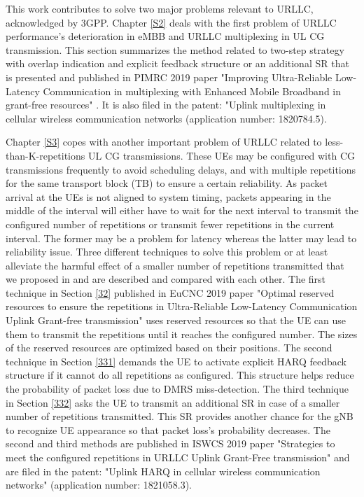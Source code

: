 \documentclass{report}
\begin{document}
This work contributes to solve two major problems relevant to URLLC, acknowledged by 3GPP. Chapter \ref{S2} deals with the first problem of URLLC performance's deterioration in eMBB and URLLC multiplexing in UL CG transmission. This section summarizes the method related to two-step strategy with overlap indication and explicit feedback structure or an additional SR that is presented and published in  PIMRC 2019 paper "Improving Ultra-Reliable Low-Latency Communication in multiplexing with Enhanced Mobile Broadband in grant-free resources" \cite{ad99}. It is also filed in the patent: "Uplink multiplexing in cellular wireless communication networks (application number: 1820784.5). 

Chapter \ref{S3} copes with another important problem of URLLC related to less-than-K-repetitions UL CG transmissions. These UEs may be configured with CG transmissions frequently to avoid scheduling delays, and with multiple repetitions for the same transport block (TB) to ensure a certain reliability. As packet arrival at the UEs is not aligned to system timing, packets appearing in the middle of the interval will either have to wait for the next interval to transmit the configured number of repetitions or transmit fewer repetitions in the current interval. The former may be a problem for latency whereas the latter may lead to reliability issue. Three different techniques to solve this problem or at least alleviate the harmful effect of a smaller number of repetitions transmitted that we proposed in \cite{b9} and \cite{ad100} are described and compared with each other. The first technique in Section \ref{32} published in EuCNC 2019 paper "Optimal reserved resources to ensure the repetitions in Ultra-Reliable Low-Latency Communication Uplink Grant-free transmission" \cite{b9} uses reserved resources so that the UE can use them to transmit the repetitions until it reaches the configured number. The sizes of the reserved resources are optimized based on their positions. The second technique in Section \ref{331} demands the UE to activate explicit HARQ feedback structure if it cannot do all repetitions as configured. This structure helps reduce the probability of packet loss due to DMRS miss-detection. The third technique in Section \ref{332} asks the UE to transmit an additional SR in case of a smaller number of repetitions transmitted. This SR provides another chance for the gNB to recognize UE appearance so that packet loss's probability decreases. The second and third methods are published in ISWCS 2019 paper "Strategies to meet the configured repetitions in URLLC Uplink Grant-Free transmission" and are filed in the patent: "Uplink HARQ in cellular wireless communication networks" (application number: 1821058.3). 
\end{document}
